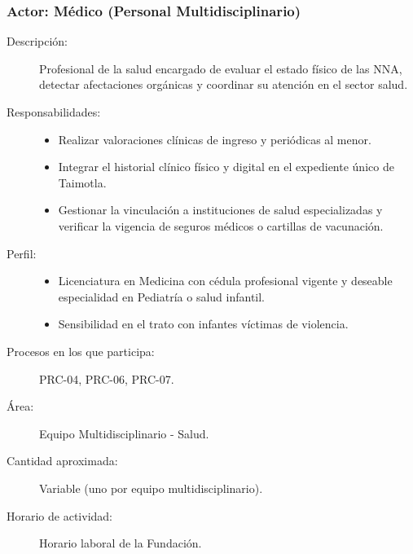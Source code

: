 \subsubsection{Actor: Médico (Personal Multidisciplinario)}
\begin{description}
	\item[Descripción:] Profesional de la salud encargado de evaluar el estado físico de las NNA, detectar afectaciones orgánicas y coordinar su atención en el sector salud.
	\item[Responsabilidades:] \cdtEmpty
	\begin{itemize}
		\item Realizar valoraciones clínicas de ingreso y periódicas al menor.
		\item Integrar el historial clínico físico y digital en el expediente único de Taimotla.
		\item Gestionar la vinculación a instituciones de salud especializadas y verificar la vigencia de seguros médicos o cartillas de vacunación.
	\end{itemize}
	\item[Perfil:] \cdtEmpty
	\begin{itemize}
		\item Licenciatura en Medicina con cédula profesional vigente y deseable especialidad en Pediatría o salud infantil.
		\item Sensibilidad en el trato con infantes víctimas de violencia.
	\end{itemize}
	\item[Procesos en los que participa:] PRC-04, PRC-06, PRC-07.
	\item[Área:] Equipo Multidisciplinario - Salud.
	\item[Cantidad aproximada:] Variable (uno por equipo multidisciplinario).
	\item[Horario de actividad:] Horario laboral de la Fundación.
\end{description}


